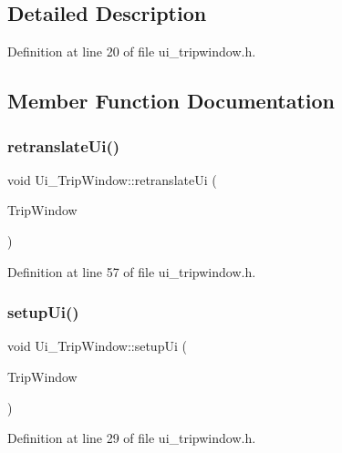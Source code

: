 \subsection{Detailed Description}


Definition at line 20 of file ui\+\_\+tripwindow.\+h.



\subsection{Member Function Documentation}
\mbox{\label{class_ui___trip_window_a9695983139e7fd78cee61c7a8b920bf8}} 
\subsubsection{\texorpdfstring{retranslateUi()}{retranslateUi()}}
{\footnotesize\ttfamily void Ui\+\_\+\+Trip\+Window\+::retranslate\+Ui (\begin{DoxyParamCaption}\item[{Q\+Widget $\ast$}]{Trip\+Window }\end{DoxyParamCaption})\hspace{0.3cm}{\ttfamily [inline]}}



Definition at line 57 of file ui\+\_\+tripwindow.\+h.

\mbox{\label{class_ui___trip_window_a42dbbe827a8e59f90d532bc9febed469}} 
\subsubsection{\texorpdfstring{setupUi()}{setupUi()}}
{\footnotesize\ttfamily void Ui\+\_\+\+Trip\+Window\+::setup\+Ui (\begin{DoxyParamCaption}\item[{Q\+Widget $\ast$}]{Trip\+Window }\end{DoxyParamCaption})\hspace{0.3cm}{\ttfamily [inline]}}



Definition at line 29 of file ui\+\_\+tripwindow.\+h.



